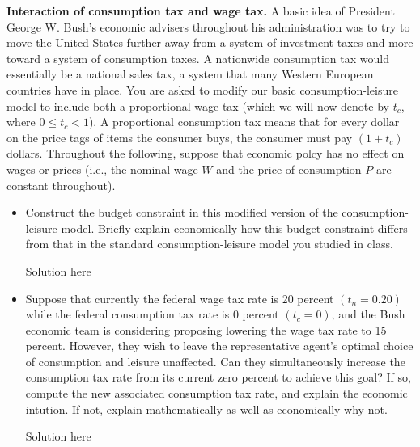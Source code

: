 \documentclass[11pt]{SelfArxOneColBMN}
\affiliation{\textsuperscript{1}\textit{John E. Walker Department of Economics,
Clemson University,Clemson, SC: email ijdavis@g.clemson.edu}}
\date{\small{Version ~\today}}
\begin{document}
\flushbottom

\maketitle


	
\begin{exercise}
\textbf{Interaction of consumption tax and wage tax.} A basic idea of President George W. Bush's economic advisers throughout his administration was to try to move the United States further away from a system of investment taxes and more toward a system of consumption taxes. A nationwide consumption tax would essentially be a national sales tax, a system that many Western European countries have in place. You are asked to modify our basic consumption-leisure model to include both a proportional wage tax (which we will now denote by $t_c$, where $0 \leq t_c < 1$). A proportional consumption tax means that for every dollar on the price tags of items the consumer buys, the consumer must pay $(1 + t_c)$ dollars. Throughout the following, suppose that economic polcy has no effect on wages or prices (i.e., the nominal wage $W$ and the price of consumption $P$ are constant throughout).

\begin{itemize}
\item Construct the budget constraint in this modified version of the consumption-leisure model. Briefly explain economically how this budget constraint differs from that in the standard consumption-leisure model you studied in class.

	\begin{solution}
		Solution here
	\end{solution}

\item Suppose that currently the federal wage tax rate is 20 percent $(t_n = 0.20)$ while the federal consumption tax rate is 0 percent $(t_c =0)$, and the Bush economic team is considering proposing lowering the  wage tax rate to 15 percent. However, they wish to leave the representative agent's optimal choice of consumption and leisure unaffected. Can they simultaneously increase the consumption tax rate from its current zero percent to achieve this goal? If so, compute the new associated consumption tax rate, and explain the economic intution. If not, explain mathematically as well as economically why not.

        \begin{solution}
                Solution here
        \end{solution}



\end{itemize}
\end{exercise}
\end{document}
